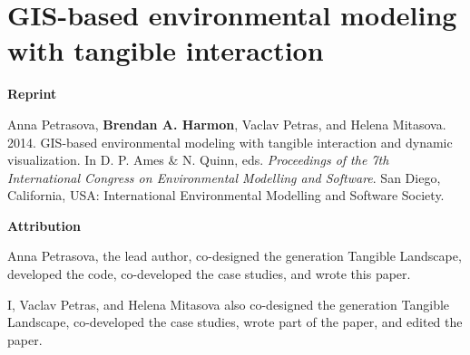 \chapter[GIS-based environmental modeling with tangible interaction and dynamic visualization]{GIS-based environmental modeling with tangible interaction}
\label{app-a}

\textbf{Reprint}

Anna Petrasova, \textbf{Brendan A. Harmon}, Vaclav Petras, and Helena Mitasova. 2014. GIS-based environmental modeling with tangible interaction and dynamic visualization. In D. P. Ames \& N. Quinn, eds. \emph{Proceedings of the 7th International Congress on Environmental Modelling and Software}. San Diego, California, USA: International Environmental Modelling and Software Society.

\textbf{Attribution}

Anna Petrasova, the lead author, 
co-designed the  generation Tangible Landscape,
developed the code, 
co-developed the case studies,
and wrote this paper.

I, Vaclav Petras, and Helena Mitasova
also co-designed the  generation Tangible Landscape,
co-developed the case studies,
wrote part of the paper,
and edited the paper.

\vfil
\pagebreak

%


